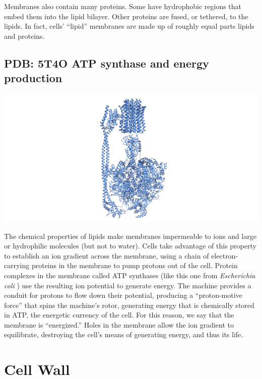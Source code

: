 \documentclass[]{tufte-book}
\begin{document}
Membranes also contain many proteins. Some have hydrophobic regions that
embed them into the lipid bilayer. Other proteins are fused, or
tethered, to the lipids. In fact, cells' ``lipid'' membranes are made up
of roughly equal parts lipids and proteins.

\subsection{PDB: 5T4O ATP synthase and energy
production}\label{PDB:_5T4O_ATP_synthase_and_energy_production}

\includegraphics{img/schematics/2_1_2}

The chemical properties of lipids make membranes impermeable to ions and
large or hydrophilic molecules (but not to water). Cells take advantage
of this property to establish an ion gradient across the membrane, using
a chain of electron-carrying proteins in the membrane to pump protons
out of the cell. Protein complexes in the membrane called ATP synthases
(like this one from \emph{Escherichia coli} \citet{sobti2016}) use the
resulting ion potential to generate energy. The machine provides a
conduit for protons to flow down their potential, producing a
``proton-motive force'' that spins the machine's rotor, generating
energy that is chemically stored in ATP, the energetic currency of the
cell. For this reason, we say that the membrane is ``energized.'' Holes
in the membrane allow the ion gradient to equilibrate, destroying the
cell's means of generating energy, and thus its life.

\section{Cell Wall}\label{cell-wall}
\end{document}
